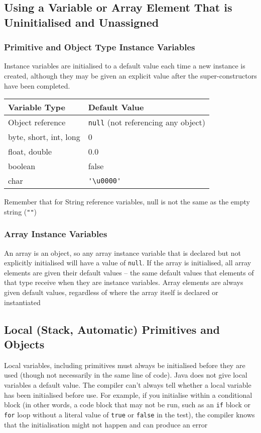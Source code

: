 \subsection{Using a Variable or Array Element That is Uninitialised and 
Unassigned}
\subsubsection{Primitive and Object Type Instance Variables}
Instance variables are initialised to a default value each time a new instance 
is created, although they may be given an explicit value after the 
super-constructors have been completed.

\begin{center}
\begin{tabular}{ll}
    \textbf{Variable Type} & \textbf{Default Value} \\
    \hline
    Object reference & \verb#null# (not referencing any object) \\
    byte, short, int, long & 0 \\
    float, double & 0.0 \\
    boolean & false \\
    char & \verb#'\u0000'# \\
\end{tabular}
\end{center}
Remember that for String reference variables, null is not the same as the empty 
string (\verb#""#)

\subsubsection{Array Instance Variables}
An array is an object, so any array instance variable that is declared but not 
explicitly initialised will have a value of \verb#null#. If the array is 
initialised, all array elements are given their default values -- the same 
default values that elements of that type receive when they are instance 
variables. Array elements are always given default values, regardless of where 
the array itself is declared or instantiated

\subsection{Local (Stack, Automatic) Primitives and Objects}
Local variables, including primitives must always be initialised before they 
are used (though not necessarily in the same line of code). Java does not give 
local variables a default value. The compiler can't always tell whether a local 
variable has been initialised before use. For example, if you initialise within 
a conditional block (in other words, a code block that may not be run, such as 
an \verb#if# block or \verb#for# loop without a literal value of \verb#true# or 
\verb#false# in the test), the compiler knows that the initialisation might not 
happen and can produce an error

